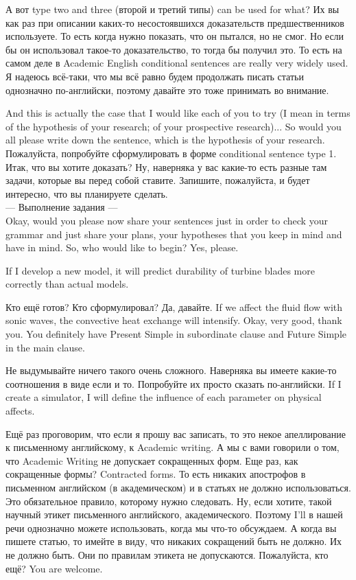 \documentclass[main.tex]{subfiles}
\begin{document}
А вот type two and three (второй и третий типы) can be used for what?
Их вы как раз при описании каких-то несостоявшихся доказательств предшественников используете.
То есть когда нужно показать, что он пытался, но не смог.
Но если бы он использовал такое-то доказательство, то тогда бы получил это.
То есть на самом деле в Academic English conditional sentences are really very widely used.
Я надеюсь всё-таки, что мы всё равно будем продолжать писать статьи однозначно по-английски, поэтому давайте это тоже принимать во внимание.

\newpage
{}

And this is actually the case that I would like each of you to try (I mean in terms of the hypothesis of your research; of your prospective research)...
So would you all please write down the sentence, which is the hypothesis of your research.
Пожалуйста, попробуйте сформулировать в форме conditional sentence type 1.
Итак, что вы хотите доказать?
Ну, наверняка у вас какие-то есть разные там задачи, которые вы перед собой ставите.
Запишите, пожалуйста, и будет интересно, что вы планируете сделать.
\\

--- Выполнение задания ---
\\

Okay, would you please now share your sentences just in order to check your grammar and just share your plans, your hypotheses that you keep in mind and have in mind.
So, who would like to begin?
Yes, please.

If I develop a new model, it will predict durability of turbine blades more correctly than actual models.

Кто ещё готов? Кто сформулировал? Да, давайте.
If we affect the fluid flow with sonic waves, the convective heat exchange will intensify.
Okay, very good, thank you.
You definitely have Present Simple in subordinate clause and Future Simple in the main clause.

Не выдумывайте ничего такого очень сложного.
Наверняка вы имеете какие-то соотношения в виде если и то.
Попробуйте их просто сказать по-английски.
If I create a simulator, I will define the influence of each parameter on physical affects.

Ещё раз проговорим, что если я прошу вас записать, то это некое апеллирование к письменному английскому, к Academic writing.
А мы с вами говорили о том, что Academic Writing не допускает сокращенных форм.
Еще раз, как сокращенные формы?
Contracted forms.
То есть никаких апострофов в письменном английском (в академическом) и в статьях не должно использоваться.
Это обязательное правило, которому нужно следовать.
Ну, если хотите, такой научный этикет письменного английского, академического.
Поэтому I'll в нашей речи однозначно можете использовать, когда мы что-то обсуждаем.
А когда вы пишете статью, то имейте в виду, что никаких сокращений быть не должно.
Их не должно быть.
Они по правилам этикета не допускаются.
Пожалуйста, кто ещё?
You are welcome.
\end{document}
